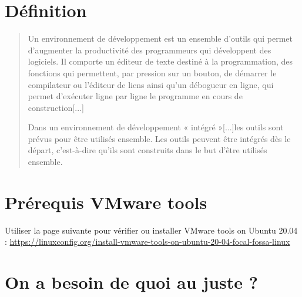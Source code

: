 	
	\section{Définition}
	\begin{quotation}
		Un environnement de développement est un ensemble d'outils qui permet d'augmenter la productivité des programmeurs qui développent des logiciels. Il comporte un éditeur de texte destiné à la programmation, des fonctions qui permettent, par pression sur un bouton, de démarrer le compilateur ou l'éditeur de liens ainsi qu'un débogueur en ligne, qui permet d'exécuter ligne par ligne le programme en cours de construction[...]
		
		Dans un environnement de développement « intégré »[...]les outils sont prévus pour être utilisés ensemble. Les outils peuvent être intégrés dès le départ, c'est-à-dire qu'ils sont construits dans le but d'être utilisés ensemble. \cite{Wikipedia_EDI_2020}
	\end{quotation}
	
	\section{Prérequis VMware tools}
	
	Utiliser la page suivante pour vérifier ou installer VMware tools on Ubuntu 20.04 :
	\url{https://linuxconfig.org/install-vmware-tools-on-ubuntu-20-04-focal-fossa-linux}
	
	\section{On a besoin de quoi au juste ?}
	
